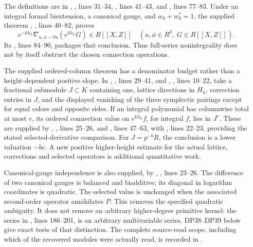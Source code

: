 The definitions are in , , lines 31--34, , lines 41--43, and , lines 77--83. Under an integral formal biextension, a canonical gauge, and $w_0+w_0^*=1$, the supplied theorem
,
, lines 40--82, proves
\[
 e^{-kh_L}\nabla_{u,\phi-Su}(e^{kh_L}G)\in R[[X,Z]]
 \quad(u,\phi\in R^d,\ G\in R[[X,Z]]).
\]
Its , lines 84--90, packages that conclusion. Thus full-series nonintegrality does not by itself obstruct the chosen connection operations.

The supplied ordered-column theorem has a denominator budget rather than a height-dependent positive slope. In , , lines 29--41, and , , lines 10--22, take a fractional submodule $J\subset K$ containing one, lattice directions in $H_h$, correction entries in $J$, and the displayed vanishing of the three symplectic pairings except for equal colors and opposite sides. If an integral polynomial has columnwise total  at most $e$, its ordered connection value on $e^{kh_L}f$, for integral $f$, lies in $J^e$. These are supplied by , , lines 25--26, and , lines 47--63, with , lines 22--23, providing the stated selected-derivative comparison. For $J=p^{-b}R$, the conclusion is a lower valuation $-be$. A new positive higher-height estimate for the actual lattice, corrections and selected operators is additional quantitative work.

Canonical-gauge independence is also supplied, by
,
, lines 23--26. The difference of two canonical gauges is balanced and biadditive; its diagonal in logarithm coordinates is quadratic. The selected value is unchanged when the associated second-order operator annihilates $P$. This removes the specified quadratic ambiguity. It does not remove an arbitrary higher-degree primitive kernel: the series  in , lines 186--201, is an arbitrary multivariable series. DP38--DP39 below give exact tests of that distinction. The complete source-read scope, including which of the recovered modules were actually read, is recorded in .

